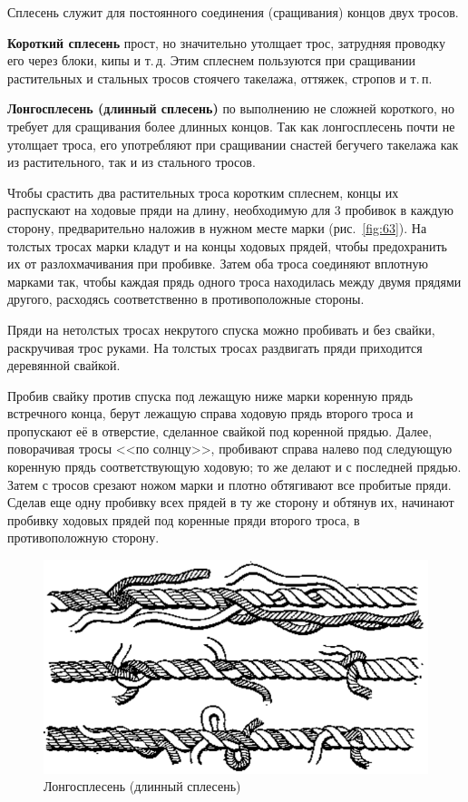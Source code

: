 \documentclass[a4paper, 12pt, twoside, final]{scrbook}
\begin{document}
Сплесень служит для постоянного соединения (сращивания) концов двух тросов.

\textbf{Короткий сплесень} прост, но значительно утолщает трос, затрудняя проводку его через блоки, кипы и т.\,д. Этим сплеснем пользуются при сращивании растительных и стальных тросов стоячего такелажа, оттяжек, стропов и т.\,п.

\textbf{Лонгосплесень (длинный сплесень)} по выполнению не сложней короткого, но требует для сращивания более длинных концов. Так как лонгосплесень почти не утолщает троса, его употребляют при сращивании снастей бегучего такелажа как из растительного, так и из стального тросов.

Чтобы срастить два растительных троса коротким сплеснем, концы их распускают на ходовые пряди на длину, необходимую для 3 пробивок в каждую сторону, предварительно наложив в нужном месте марки (рис.~\ref{fig:63}). На толстых тросах марки кладут и на концы ходовых прядей, чтобы предохранить их от разлохмачивания при пробивке. Затем оба троса соединяют вплотную марками так, чтобы каждая прядь одного троса находилась между двумя прядями другого, расходясь соответственно в противоположные стороны.

Пряди на нетолстых тросах некрутого спуска можно пробивать и без свайки, раскручивая трос руками. На толстых тросах раздвигать пряди приходится деревянной свайкой.

Пробив свайку против спуска под лежащую ниже марки коренную прядь встречного конца, берут лежащую справа ходовую прядь второго троса и пропускают её в отверстие, сделанное свайкой под коренной прядью. Далее, поворачивая тросы <<по солнцу>>, пробивают справа налево под следующую коренную прядь соответствующую ходовую; то же делают и с последней прядью. Затем с тросов срезают ножом марки и плотно обтягивают все пробитые пряди. Сделав еще одну пробивку всех прядей в ту же сторону и обтянув их, начинают пробивку ходовых прядей под коренные пряди второго троса, в противоположную сторону.

\begin{figure}
   \centering
   \includegraphics[scale=0.75]{64_Longosplesen} %
   \caption{Лонгосплесень (длинный сплесень)}
   \label{fig:64}
\end{figure}
\end{document}
